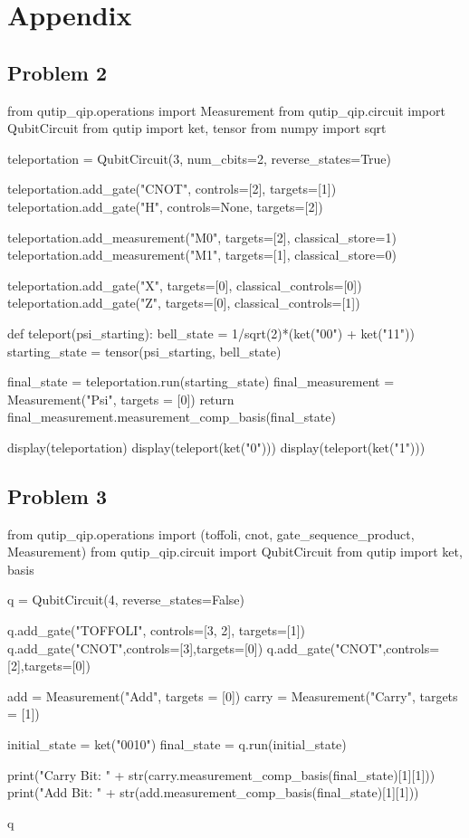 \section*{Appendix}
\subsection*{Problem 2}
\begin{python}
from qutip_qip.operations import Measurement
from qutip_qip.circuit import QubitCircuit
from qutip import ket, tensor
from numpy import sqrt

teleportation = QubitCircuit(3, num_cbits=2, reverse_states=True)

teleportation.add_gate("CNOT", controls=[2], targets=[1])
teleportation.add_gate("H", controls=None, targets=[2])

teleportation.add_measurement("M0", targets=[2], classical_store=1)
teleportation.add_measurement("M1", targets=[1], classical_store=0)

teleportation.add_gate("X", targets=[0], classical_controls=[0])
teleportation.add_gate("Z", targets=[0], classical_controls=[1])

def teleport(psi_starting):
    bell_state = 1/sqrt(2)*(ket("00") + ket("11"))
    starting_state = tensor(psi_starting, bell_state)
    
    final_state = teleportation.run(starting_state)
    final_measurement = Measurement("Psi", targets = [0])
    return final_measurement.measurement_comp_basis(final_state)

display(teleportation)
display(teleport(ket("0")))
display(teleport(ket("1")))
\end{python}

\pagebreak
\subsection*{Problem 3}
\begin{python}
from qutip_qip.operations import (toffoli, cnot, gate_sequence_product, Measurement)
from qutip_qip.circuit import QubitCircuit
from qutip import ket, basis


q = QubitCircuit(4, reverse_states=False)

q.add_gate("TOFFOLI", controls=[3, 2], targets=[1])
q.add_gate("CNOT",controls=[3],targets=[0])
q.add_gate("CNOT",controls=[2],targets=[0])

add = Measurement("Add", targets = [0])
carry = Measurement("Carry", targets = [1])

initial_state = ket("0010")
final_state = q.run(initial_state)

print("Carry Bit: " + str(carry.measurement_comp_basis(final_state)[1][1]))
print("Add Bit: " + str(add.measurement_comp_basis(final_state)[1][1]))

q
\end{python}